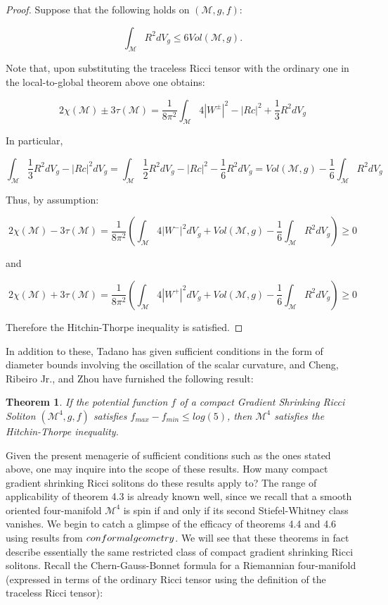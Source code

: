 \documentclass[openany, amssymb, psamsfonts]{amsart}
\newtheorem{thm}{Theorem}[section]
\theoremstyle{definition}
\numberwithin{equation}{section}
\begin{document}
\begin{proof}

Suppose that the following holds on $(\mathcal{M}, g, f)$: 

$$\int_{\mathcal{M}} R^2 dV_g \leq 6Vol(\mathcal{M}, g).$$

Note that, upon substituting the traceless Ricci tensor with the ordinary one in the local-to-global theorem above one obtains:

$$2\chi(\mathcal{M}) \pm 3\tau(\mathcal{M}) = 
\frac{1}{8\pi^2} \int_{\mathcal{M}} 4|W^{\pm}|^2 - |Rc|^2 + \frac{1}{3}R^2 dV_g$$

In particular, 

$$\int_{\mathcal{M}} \frac{1}{3}R^2 dV_g - |Rc|^2 dV_g = 
\int_{\mathcal{M}} \frac{1}{2}R^2 dV_g - |Rc|^2 - \frac{1}{6}R^2 dV_g=
Vol(\mathcal{M}, g) - \frac{1}{6}\int_{\mathcal{M}} R^2 dV_g$$

Thus, by assumption:

$$2\chi(\mathcal{M}) - 3\tau(\mathcal{M}) =  \frac{1}{8\pi^2} (\int_{\mathcal{M}} 4|W^{-}|^2 dV_g + Vol(\mathcal{M},g) - \frac{1}{6}\int_{\mathcal{M}} R^2 dV_g) \geq 0$$

and 

$$2\chi(\mathcal{M}) + 3\tau(\mathcal{M}) =  \frac{1}{8\pi^2} (\int_{\mathcal{M}} 4|W^{+}|^2 dV_g + Vol(\mathcal{M},g) - \frac{1}{6}\int_{\mathcal{M}} R^2 dV_g) \geq 0$$

Therefore the Hitchin-Thorpe inequality is satisfied.

\end{proof}

In addition to these, Tadano \cite{tad} has given sufficient conditions in the form of diameter bounds involving the oscillation of the scalar curvature, and Cheng, Ribeiro Jr., and Zhou \cite{ernani} have furnished the following result:

\begin{thm}
If the potential function $f$ of a compact Gradient Shrinking Ricci Soliton $(\mathcal{M}^4, g, f)$ satisfies $f_{max} - f_{min} \leq log(5)$, then $\mathcal{M}^4$ satisfies the Hitchin-Thorpe inequality. 
\end{thm}
    
Given the present menagerie of sufficient conditions such as the ones stated above, one may inquire into the scope of these results. How many compact gradient shrinking Ricci solitons do these results apply to? The range of applicability of theorem 4.3 is already known well, since we recall that a smooth oriented four-manifold $\mathcal{M}^4$ is spin if and only if its second Stiefel-Whitney class vanishes. We begin to catch a glimpse of the efficacy of theorems 4.4 and 4.6 using results from $\emph{conformal geometry}$. We will see that these theorems in fact describe essentially the same restricted class of compact gradient shrinking Ricci solitons. Recall the Chern-Gauss-Bonnet formula for a Riemannian four-manifold (expressed in terms of the ordinary Ricci tensor using the definition of the traceless Ricci tensor):
\end{document}
